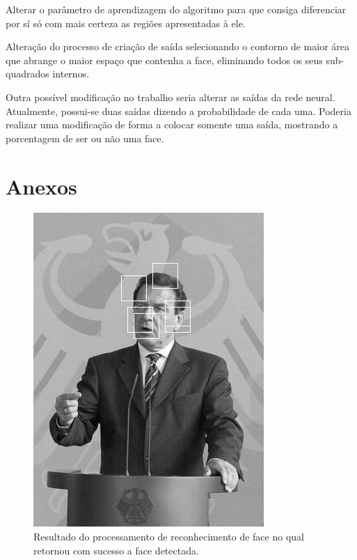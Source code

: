 \documentclass[10pt, conference]{IEEEtran}
\begin{document}
		Alterar o parâmetro de aprendizagem do algoritmo para que consiga diferenciar por sí só com mais certeza as regiões apresentadas à ele.
		
		Alteração do processo de criação de saída selecionando o contorno de maior área que abrange o maior espaço que contenha a face, eliminando todos os seus sub-quadrados internos.
		
		Outra possível modificação no trabalho seria alterar as saídas da rede neural. Atualmente, possui-se duas saídas dizendo a probabilidade de cada uma. Poderia realizar uma modificação de forma a colocar somente uma saída, mostrando a porcentagem de ser ou não uma face.

\iffinal

\fi





\section*{Anexos}
	\begin{figure}[ht]
		\centering
		\includegraphics[width=0.65\linewidth]{img/detect_2.jpg}
		\caption{Resultado do processamento de reconhecimento de face no qual retornou com sucesso a face detectada.}
		\label{fig:detect_2}
	\end{figure}
\end{document}
